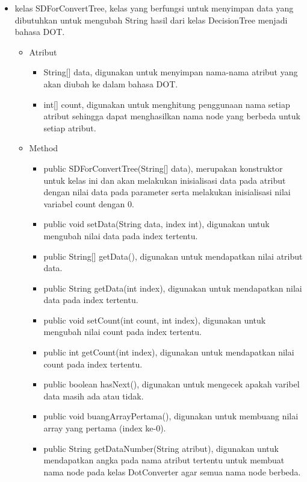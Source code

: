 \begin{itemize}
	\item kelas SDForConvertTree, kelas yang berfungsi untuk menyimpan data yang dibutuhkan untuk mengubah String hasil dari kelas DecisionTree menjadi bahasa DOT.
	\begin{itemize}
		\item Atribut
		\begin{itemize}
			\item String[] data, digunakan untuk menyimpan nama-nama atribut yang akan diubah ke dalam bahasa DOT.
			\item int[] count, digunakan untuk menghitung penggunaan nama setiap atribut sehingga dapat menghasilkan nama node yang berbeda untuk setiap atribut.
		\end{itemize}
		\item Method
		\begin{itemize}
			\item public SDForConvertTree(String[] data), merupakan konstruktor untuk kelas ini dan akan melakukan inisialisasi data pada atribut dengan nilai data pada parameter serta melakukan inisialisasi nilai variabel count dengan 0.
			\item public void setData(String data, index int), digunakan untuk mengubah nilai data pada index tertentu.
			\item public String[] getData(), digunakan untuk mendapatkan nilai atribut data.
			\item public String getData(int index), digunakan untuk mendapatkan nilai data pada index tertentu.
			\item public void setCount(int count, int index), digunakan untuk mengubah nilai count pada index tertentu.
			\item public int getCount(int index), digunakan untuk mendapatkan nilai count pada index tertentu.
			\item public boolean hasNext(), digunakan untuk mengecek apakah varibel data masih ada atau tidak.
			\item public void buangArrayPertama(), digunakan untuk membuang nilai array yang pertama (index ke-0).
			\item public String getDataNumber(String atribut), digunakan untuk mendapatkan angka pada nama atribut tertentu untuk membuat nama node pada kelas DotConverter agar semua nama node berbeda.
		\end{itemize}
	\end{itemize}
\end{itemize}

